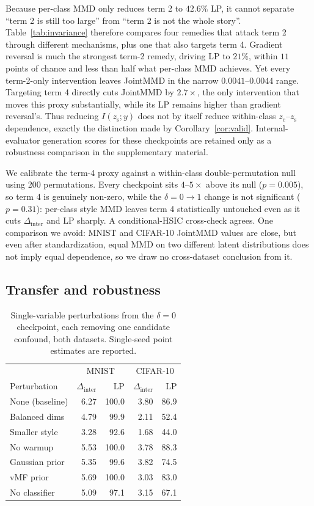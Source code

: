 \documentclass[letterpaper]{article}
\newcommand{\zc}{z_{\mathrm{c}}}
\newcommand{\zs}{z_{\mathrm{s}}}
\newcommand{\Dinter}{\Delta_{\mathrm{inter}}}
\begin{document}
Because per-class MMD only reduces term 2 to $42.6\%$ LP, it cannot separate
``term 2 is still too large'' from ``term 2 is not the whole story''.
Table~\ref{tab:invariance} therefore compares four remedies that attack term
2 through different mechanisms, plus one that also targets term 4.
{Gradient reversal is much the strongest term-2 remedy, driving LP to
$21\%$, within $11$ points of chance and less than half what per-class MMD
achieves. Yet every term-2-only intervention leaves JointMMD in the narrow
$0.0041$--$0.0044$ range. Targeting term 4 directly cuts JointMMD by
$2.7\times$, the only intervention that moves this proxy substantially,
while its LP remains higher than gradient reversal's. Thus reducing
$I(\zs;y)$ does not by itself reduce within-class $\zc$--$\zs$ dependence,
exactly the distinction made by Corollary~\ref{cor:valid}. Internal-evaluator
generation scores for these checkpoints are retained only as a robustness
comparison in the supplementary material.}

We calibrate the term-4 proxy against a within-class double-permutation null
using 200 permutations. {Every checkpoint sits $4$--$5\times$ above its null
($p{=}0.005$), so term
4 is genuinely non-zero, while the $\delta{=}0\to1$ change is not significant
($p{=}0.31$): per-class style MMD leaves term 4 statistically untouched even
as it cuts $\Dinter$ and LP sharply. A conditional-HSIC cross-check agrees.}
One comparison we avoid: MNIST and CIFAR-10 JointMMD values are close, but
even after standardization, equal MMD on two different latent distributions
does not imply equal dependence, so we draw no cross-dataset conclusion from
it.

\subsection{Transfer and robustness}
\label{sec:exp-robust}

\begin{table}[t]
\centering
\small
\setlength{\tabcolsep}{3.5pt}
\caption{Single-variable perturbations from the $\delta{=}0$ checkpoint,
each removing one candidate confound, both datasets. Single-seed point
estimates are reported.}
\label{tab:audit}
\scriptsize
\setlength{\tabcolsep}{2.5pt}
\begin{tabular}{lrrrr}
\toprule
& \multicolumn{2}{c}{MNIST} & \multicolumn{2}{c}{CIFAR-10} \\
Perturbation & $\Dinter$ & LP & $\Dinter$ & LP \\
\midrule
None (baseline) & 6.27 & 100.0 & 3.80 & 86.9 \\
Balanced dims & 4.79 & 99.9 & 2.11 & 52.4 \\
Smaller style & 3.28 & 92.6 & 1.68 & 44.0 \\
No warmup & 5.53 & 100.0 & 3.78 & 88.3 \\
Gaussian prior & 5.35 & 99.6 & 3.82 & 74.5 \\
vMF prior & 5.69 & 100.0 & 3.03 & 83.0 \\
No classifier & 5.09 & 97.1 & 3.15 & 67.1 \\
\bottomrule
\end{tabular}
\end{table}
\end{document}
